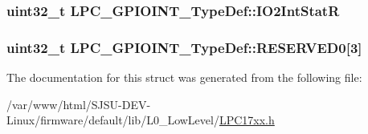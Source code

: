 \subsubsection[{\texorpdfstring{I\+O2\+Int\+StatR}{IO2IntStatR}}]{ uint32\+\_\+t L\+P\+C\+\_\+\+G\+P\+I\+O\+I\+N\+T\+\_\+\+Type\+Def\+::\+I\+O2\+Int\+StatR}\hypertarget{structLPC__GPIOINT__TypeDef_a3ff6df7dfc2b6f87b8632eb91ba5f8ab}{}\label{structLPC__GPIOINT__TypeDef_a3ff6df7dfc2b6f87b8632eb91ba5f8ab}
\subsubsection[{\texorpdfstring{R\+E\+S\+E\+R\+V\+E\+D0}{RESERVED0}}]{\setlength{\rightskip}{0pt plus 5cm}uint32\+\_\+t L\+P\+C\+\_\+\+G\+P\+I\+O\+I\+N\+T\+\_\+\+Type\+Def\+::\+R\+E\+S\+E\+R\+V\+E\+D0\mbox{[}3\mbox{]}}\hypertarget{structLPC__GPIOINT__TypeDef_a30c5656ec060ec3a66144a898c617b14}{}\label{structLPC__GPIOINT__TypeDef_a30c5656ec060ec3a66144a898c617b14}


The documentation for this struct was generated from the following file\+:\begin{DoxyCompactItemize}
\item 
/var/www/html/\+S\+J\+S\+U-\/\+D\+E\+V-\/\+Linux/firmware/default/lib/\+L0\+\_\+\+Low\+Level/\hyperlink{LPC17xx_8h}{L\+P\+C17xx.\+h}\end{DoxyCompactItemize}
